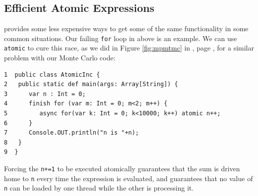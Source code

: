 \subsection{Efficient Atomic Expressions}\label{ssec:efficient}
\Xten{} provides some less expensive ways to get some of the same functionality
in some common situations.  Our failing {\tt for} loop in  
above is an example.  We can use {\tt atomic} to cure this race, as we did
in Figure \ref{fig:mpmtmc} in , page
\pageref{fig:mpmtmc}, for a similar problem with our Monte Carlo code:  
\begin{verbatim}
1  public class AtomicInc {
2  	public static def main(args: Array[String]) {
3  	   var n : Int = 0;
4  	   finish for (var m: Int = 0; m<2; m++) {
5  	      async for(var k: Int = 0; k<10000; k++) atomic n++; 
6  	   }
7  	   Console.OUT.println("n is "+n);
8  	}
9  }
\end{verbatim}

Forcing the {\tt n+=1} to be executed atomically guarantees that the sum is driven
home to {\tt n} every time the expression is evaluated, and guarantees that no
value of {\tt n} can be loaded by one thread while the other is processing it.

